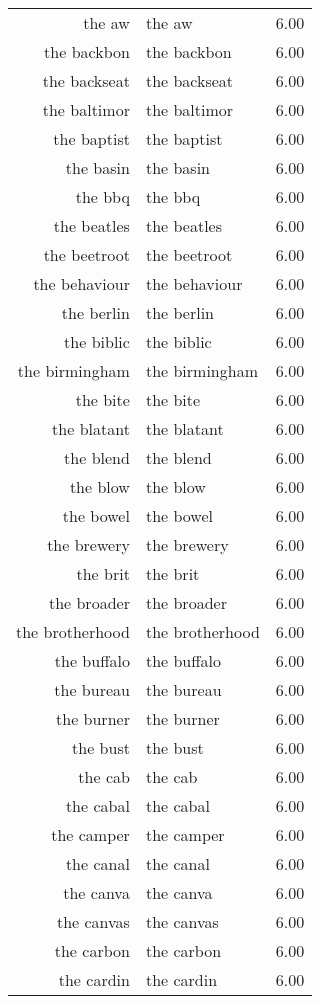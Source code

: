 \begin{table}[ht]
\begin{tabular}{rlr}
  the aw & the aw & 6.00 \\ 
  the backbon & the backbon & 6.00 \\ 
  the backseat & the backseat & 6.00 \\ 
  the baltimor & the baltimor & 6.00 \\ 
  the baptist & the baptist & 6.00 \\ 
  the basin & the basin & 6.00 \\ 
  the bbq & the bbq & 6.00 \\ 
  the beatles & the beatles & 6.00 \\ 
  the beetroot & the beetroot & 6.00 \\ 
  the behaviour & the behaviour & 6.00 \\ 
  the berlin & the berlin & 6.00 \\ 
  the biblic & the biblic & 6.00 \\ 
  the birmingham & the birmingham & 6.00 \\ 
  the bite & the bite & 6.00 \\ 
  the blatant & the blatant & 6.00 \\ 
  the blend & the blend & 6.00 \\ 
  the blow & the blow & 6.00 \\ 
  the bowel & the bowel & 6.00 \\ 
  the brewery & the brewery & 6.00 \\ 
  the brit & the brit & 6.00 \\ 
  the broader & the broader & 6.00 \\ 
  the brotherhood & the brotherhood & 6.00 \\ 
  the buffalo & the buffalo & 6.00 \\ 
  the bureau & the bureau & 6.00 \\ 
  the burner & the burner & 6.00 \\ 
  the bust & the bust & 6.00 \\ 
  the cab & the cab & 6.00 \\ 
  the cabal & the cabal & 6.00 \\ 
  the camper & the camper & 6.00 \\ 
  the canal & the canal & 6.00 \\ 
  the canva & the canva & 6.00 \\ 
  the canvas & the canvas & 6.00 \\ 
  the carbon & the carbon & 6.00 \\ 
  the cardin & the cardin & 6.00 \\ 

\end{tabular}
\end{table}

